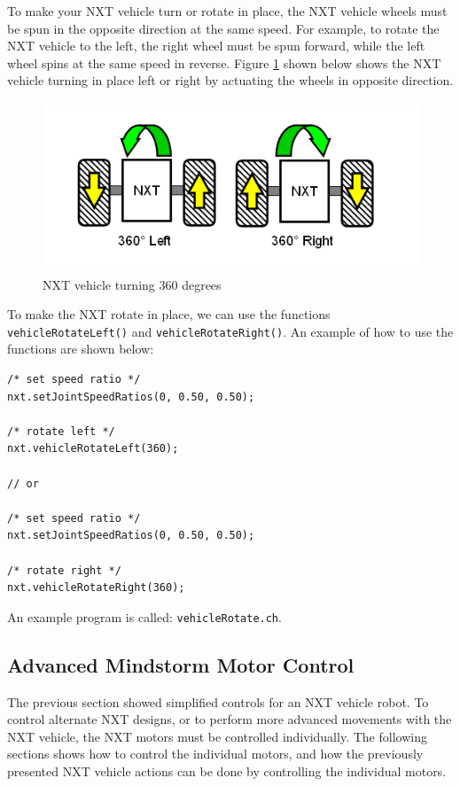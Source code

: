 \documentclass[11pt]{article}
\begin{document}
To make your NXT vehicle turn or rotate in place, the NXT vehicle wheels must 
be spun in the opposite direction at the same speed. For example, to rotate the 
NXT vehicle to the left, the right wheel must be spun forward, while the left 
wheel spins at the same speed in reverse. Figure \ref{fig_NXT_360LR} shown below 
shows the NXT vehicle turning in place left or right by actuating the wheels in 
opposite direction.
\begin{figure}[H]
  \begin{center}
    \includegraphics[height=2in]{figure/mindstorm/Vehicle_360LR.png}
    \caption{NXT vehicle turning 360 degrees \label{fig_NXT_360LR}}
  \end{center}
\end{figure}
To make the NXT rotate in place, we can use the functions {\tt vehicleRotateLeft()} 
and {\tt vehicleRotateRight()}. An example of how to use the functions are shown 
below:
\begin{lstlisting}
/* set speed ratio */
nxt.setJointSpeedRatios(0, 0.50, 0.50);
    
/* rotate left */
nxt.vehicleRotateLeft(360);

// or
    
/* set speed ratio */
nxt.setJointSpeedRatios(0, 0.50, 0.50);

/* rotate right */
nxt.vehicleRotateRight(360);
\end{lstlisting}
An example program is called: {\tt vehicleRotate.ch}.

\subsection{Advanced Mindstorm Motor Control}
The previous section showed simplified controls for an NXT vehicle robot. To 
control alternate NXT designs, or to perform more advanced movements with the 
NXT vehicle, the NXT motors must be controlled individually. The following 
sections shows how to control the individual motors, and how the previously 
presented NXT vehicle actions can be done by controlling the individual motors.
\end{document}
